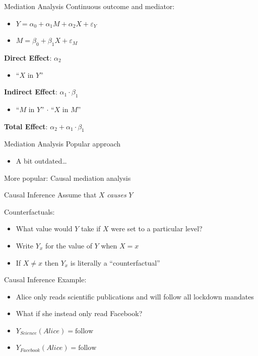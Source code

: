 \documentclass[14pt]{beamer}
\begin{document}
\begin{frame}{Mediation Analysis}
    Continuous outcome and mediator:
    \begin{itemize}
        \item $Y = \alpha_0 + \alpha_1 M + \alpha_2 X + \varepsilon_Y$
        \item $M = \beta_0 + \beta_1 X + \varepsilon_M$ \newline
    \end{itemize}

    
    \textbf{Direct Effect}: $\alpha_2$
    \begin{itemize}
        \item ``$X$ in $Y$''
    \end{itemize}
    \textbf{Indirect Effect}: $\alpha_1 \cdot \beta_1$
    \begin{itemize}
        \item ``$M$ in $Y$'' $\cdot$ ``$X$ in $M$''
    \end{itemize}
    \textbf{Total Effect}: $\alpha_2 + \alpha_1 \cdot \beta_1$

\end{frame}

\begin{frame}{Mediation Analysis}
    Popular approach
    \begin{itemize}
        \item A bit outdated\ldots \newline
    \end{itemize}

    More popular: Causal mediation analysis
    
\end{frame}

\begin{frame}{Causal Inference}
    Assume that $X$ \textit{causes} $Y$\newline

    Counterfactuals:
    \begin{itemize}
        \item What value would $Y$ take if $X$ were set to a particular level?
        \item Write $Y_x$ for the value of $Y$ when $X=x$
        \item If $X\neq x$ then $Y_x$ is literally a ``counterfactual'' 
    \end{itemize}
\end{frame}

\begin{frame}{Causal Inference}
    Example:
    \begin{itemize}
        \item Alice only reads scientific publications and will follow all lockdown mandates
        \item What if she instead only read Facebook?\newline
        \item $Y_{Science}(Alice) = \mathrm{follow}$
        \item $Y_{Facebook}(Alice) = \mathrm{follow}$
    \end{itemize}
\end{frame}
\end{document}
